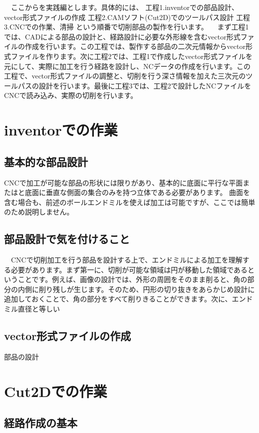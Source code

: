 \documentclass[onecolumn]{preport}
\begin{document}
　ここからを実践編とします。具体的には、
工程1.inventorでの部品設計、vector形式ファイルの作成
工程2.CAMソフト(Cut2D)でのツールパス設計
工程3.CNCでの作業、清掃
という順番で切削部品の製作を行います。
　まず工程1では、CADによる部品の設計と、経路設計に必要な外形線を含むvector形式ファイルの作成を行います。この工程では、製作する部品の二次元情報からvector形式ファイルを作ります。次に工程2では、工程1で作成したvector形式ファイルを元にして、実際に加工を行う経路を設計し、NCデータの作成を行います。この工程で、vector形式ファイルの調整と、切削を行う深さ情報を加えた三次元のツールパスの設計を行います。最後に工程3では、工程2で設計したNCファイルをCNCで読み込み、実際の切削を行います。

\section{inventorでの作業}

\subsection{基本的な部品設計}
CNCで加工が可能な部品の形状には限りがあり、基本的に底面に平行な平面またはと底面に垂直な側面の集合のみを持つ立体である必要があります。
曲面を含む場合も、前述のボールエンドミルを使えば加工は可能ですが、ここでは簡単のため説明しません。
\subsection{部品設計で気を付けること}
　CNCで切削加工を行う部品を設計する上で、エンドミルによる加工を理解する必要があります。まず第一に、切削が可能な領域は円が移動した領域であるということです。例えば、画像の設計では、外形の周囲をそのまま削ると、角の部分の内側に削り残しが生じます。そのため、円形の切り抜きをあらかじめ設計に追加しておくことで、角の部分をすべて削りきることができます。次に、エンドミル直径と等しい

\subsection{vector形式ファイルの作成}
部品の設計


\section{Cut2Dでの作業}
\subsection{経路作成の基本}
\end{document}

